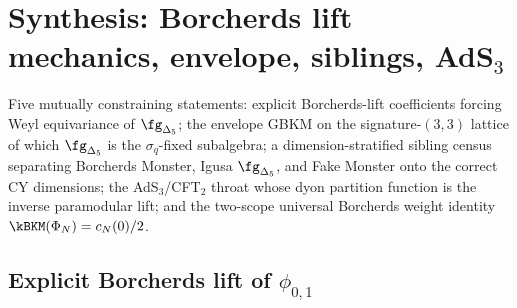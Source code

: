 \section{Synthesis: Borcherds lift mechanics, envelope, siblings, AdS\texorpdfstring{$_3$}{-3}}
\label{sec:k3e-synthesis}

Five mutually constraining statements: explicit Borcherds-lift coefficients forcing Weyl equivariance of $\fg_{\Delta_5}$; the envelope GBKM on the signature-$(3,3)$ lattice of which $\fg_{\Delta_5}$ is the $\sigma_q$-fixed subalgebra; a dimension-stratified sibling census separating Borcherds Monster, Igusa $\fg_{\Delta_5}$, and Fake Monster onto the correct CY dimensions; the AdS$_3$/CFT$_2$ throat whose dyon partition function is the inverse paramodular lift; and the two-scope universal Borcherds weight identity $\kBKM(\Phi_N) = c_N(0)/2$.

\subsection{Explicit Borcherds lift of \texorpdfstring{$\phi_{0,1}$}{phi-0,1}}
\label{subsec:k3e-platonic-borcherds-lift}

